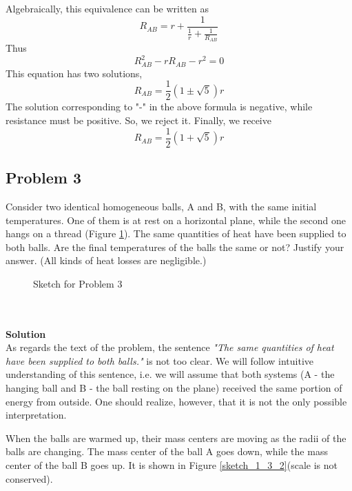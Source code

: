 \documentclass[12pt,a4paper]{book}
\begin{document}
	Algebraically, this equivalence can be written as
	\begin{equation*}
		R_{AB}=r+\frac{1}{\frac{1}{r}+\frac{1}{R_{AB}}}
	\end{equation*}
	Thus
	\begin{equation*}
		R_{AB}^2-rR_{AB}-r^2=0
	\end{equation*}
	This equation has two solutions,
	\begin{equation*}
		R_{AB}=\frac{1}{2}(1\pm\sqrt{5})r
	\end{equation*}
	The solution corresponding to "-" in the above formula is negative, while resistance must be positive. So, we reject it. Finally, we receive
	\begin{equation}
		R_{AB}=\frac{1}{2}(1+\sqrt{5})r
	\end{equation}
	\subsection*{Problem 3}
	Consider two identical homogeneous balls, A and B, with the same initial temperatures. One of them is at rest on a horizontal plane, while the second one hangs on a thread (Figure \ref{sketch_1_3_1}). The same quantities of heat have been supplied to both balls. Are the f\mbox{}inal temperatures of the balls the same or not? Justify your answer. (All kinds of heat losses are negligible.)
	\begin{figure}[!hbtp]
		\centering
		\caption{Sketch for Problem 3}
		\label{sketch_1_3_1}
	\end{figure}\\ \\
	\textbf{Solution}\\
	As regards the text of the problem, the sentence \emph{"The same quantities of heat have been supplied to both balls."} is not too clear. We will follow intuitive understanding of this sentence, i.e. we will assume that both systems (A - the hanging ball and B - the ball resting on the plane) received the same portion of energy from outside. One should realize, however, that it is not the only possible interpretation.\par
	When the balls are warmed up, their mass centers are moving as the radii of the balls are changing. The mass center of the ball A goes down, while the mass center of the ball B goes up. It is shown in Figure \ref{sketch_1_3_2}(scale is not conserved).\par
\end{document}
